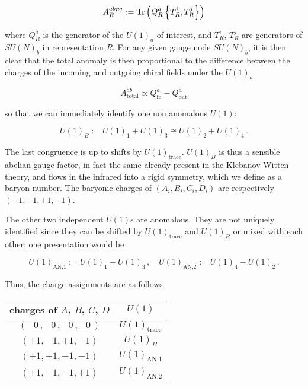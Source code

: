 \begin{equation}
	A_R^{ab;ij} := \operatorname{Tr} \left( Q_R^a \left\{T_R^i, T_R^j\right\} \right)
	\label{}
\end{equation}

where $Q_R^a$ is the generator of the $U(1)_a$ of interest, and $T_R^i$, $T_R^j$ are generators of $SU(N)_b$ in representation $R$. For any given gauge node $SU(N)_b$, it is then clear that the total anomaly is then proportional to the difference between the charges of the incoming and outgoing chiral fields under the $U(1)_a$

\begin{equation}
	A_\text{total}^{ab} \propto Q^a_\text{in} - Q^a_\text{out}
	\label{}
\end{equation}

so that we can immediately identify one non anomalous $U(1)$:

\begin{equation}
	U(1)_B := U(1)_1 + U(1)_3 \cong U(1)_2 + U(1)_4\,.
	\label{}
\end{equation}

The last congruence is up to shifts by $U(1)_\text{trace}$. $U(1)_B$ is thus a sensible abelian gauge factor, in fact the same already present in the Klebanov-Witten theory, and flows in the infrared into a rigid symmetry, which we define as a baryon number. The baryonic charges of $(A_i,B_i,C_i,D_i)$ are respectively $(+1,-1,+1,-1)$.

The other two independent $U(1)$s are anomalous. They are not uniquely identified since they can be shifted by $U(1)_\text{trace}$ and $U(1)_B$ or mixed with each other; one presentation would be

\begin{equation}
	U(1)_\text{AN,1} := U(1)_1 - U(1)_3\,,\quad U(1)_\text{AN,2} := U(1)_4 - U(1)_2\,.
	\label{}
\end{equation}

Thus, the charge assignments are as follows

\begin{center}
	\begin{tabular}[]{c|c}
		charges of $A$, $B$, $C$, $D$ & $U(1)$ \\ \hline \hline
		$(\;\,\;0\,,\;\,\;0\,,\;\,\;0\,,\,\;\;0\,)$ & $U(1)_\text{trace}$ \\  \hline
		$(+1,-1,+1,-1)$ & $U(1)_B$ \\ 
		$(+1,+1,-1,-1)$ & $U(1)_\text{AN,1}$ \\
		$(+1,-1,-1,+1)$ & $U(1)_\text{AN,2}$
	\end{tabular}
\end{center}

